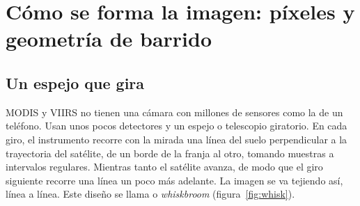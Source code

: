 \chapter{Cómo se forma la imagen: píxeles y geometría de barrido}\label{cap:escaneo}


\section{Un espejo que gira}

MODIS y VIIRS no tienen una cámara con millones de sensores como la de un teléfono. Usan unos
pocos detectores y un espejo o telescopio giratorio. En cada giro, el instrumento recorre con la
mirada una línea del suelo perpendicular a la trayectoria del satélite, de un borde de la franja
al otro, tomando muestras a intervalos regulares. Mientras tanto el satélite avanza, de modo que
el giro siguiente recorre una línea un poco más adelante. La imagen se va tejiendo así, línea a
línea. Este diseño se llama  o \emph{whiskbroom}
(figura~\ref{fig:whisk}).

